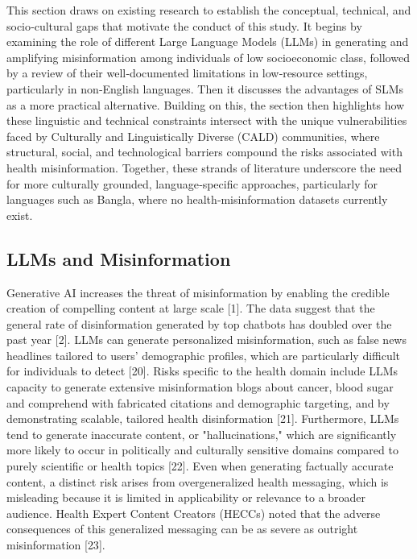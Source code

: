 \documentclass[]{article}
\begin{document}
This section draws on existing research to establish the conceptual, technical, and socio‑cultural gaps that motivate the conduct of this study. It begins
by examining the role of different Large Language Models (LLMs) in generating and
amplifying misinformation among individuals of low socioeconomic class, followed by a review of their well‑documented
limitations in low‑resource settings, particularly in non‑English
languages. Then it discusses the advantages of SLMs as a more practical
alternative. Building on this, the section then highlights how these
linguistic and technical constraints intersect with the unique
vulnerabilities faced by Culturally and Linguistically Diverse (CALD)
communities, where structural, social, and technological barriers compound the risks associated with health misinformation. Together, these strands of literature underscore the need for more culturally grounded, language‑specific approaches, particularly for languages such as Bangla, where no health‑misinformation datasets currently exist.

\subsection{LLMs and Misinformation}

Generative AI increases the threat of misinformation by enabling the credible creation of compelling content at large scale {[}1{]}. The data suggest that the general rate of
disinformation generated by top chatbots has doubled over the past year
{[}2{]}. LLMs can generate personalized misinformation, such as false
news headlines tailored to users' demographic profiles, which are particularly difficult for individuals to detect {[}20{]}. Risks specific to the health domain include LLMs\textquotesingle{} capacity to
generate extensive misinformation blogs about cancer, blood sugar and comprehend with fabricated citations and demographic targeting, and by demonstrating scalable,
tailored health disinformation {[}21{]}. Furthermore, LLMs tend to
generate inaccurate content, or "hallucinations," which are significantly more likely to occur in politically and culturally sensitive domains compared to purely scientific or health topics
{[}22{]}. Even when generating factually accurate content, a distinct
risk arises from overgeneralized health messaging, which is misleading
because it is limited in applicability or relevance to a broader
audience. Health Expert Content Creators (HECCs) noted that the adverse
consequences of this generalized messaging can be as severe as outright
misinformation {[}23{]}.
\end{document}
